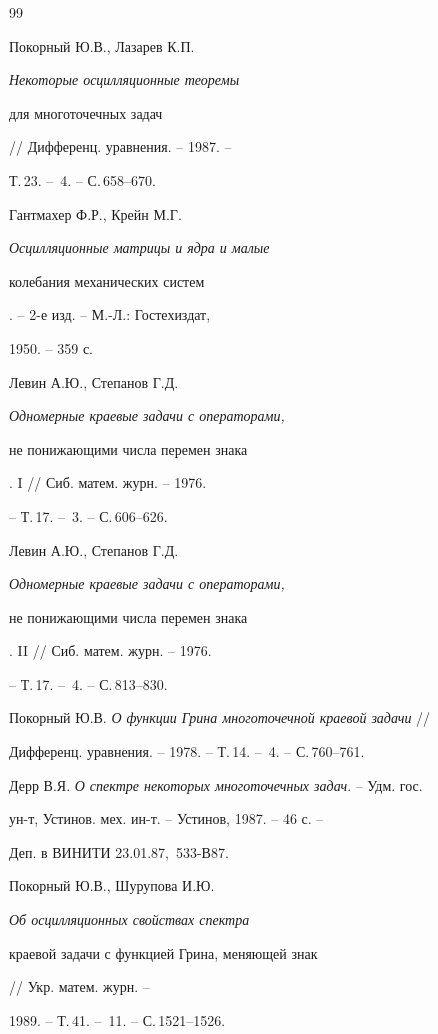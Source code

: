 \begin{thebibliography}{99} 


 




Покорный Ю.В., Лазарев К.П. {\em Некоторые осцилляционные теоремы 


для многоточечных задач} // Дифференц. уравнения. -- 1987. -- 


Т.\,23. -- \No\,4. -- С.\,658--670. 




Гантмахер Ф.Р., Крейн М.Г. {\em Осцилляционные матрицы и ядра и малые 


колебания механических систем}. -- 2-е изд. -- М.-Л.: Гостехиздат, 


1950. -- 359 с. 




Левин А.Ю., Степанов Г.Д. {\em Одномерные краевые задачи с операторами, 


не понижающими числа перемен знака}. I // Сиб. матем. журн. -- 1976. 


-- Т.\,17. -- \No\,3. -- С.\,606--626. 




Левин А.Ю., Степанов Г.Д. {\em Одномерные краевые задачи с операторами, 


не понижающими числа перемен знака}. II // Сиб. матем. журн. -- 1976. 


-- Т.\,17. -- \No\,4. -- С.\,813--830. 




Покорный Ю.В. {\em О функции Грина многоточечной краевой задачи} // 


Дифференц. уравнения. -- 1978. -- Т.\,14. -- \No\,4. -- С.\,760--761. 




Дерр В.Я. {\em О спектре некоторых многоточечных задач}. -- Удм. гос. 


ун-т, Устинов. мех. ин-т. -- Устинов, 1987. -- 46 с. -- 


Деп. в ВИНИТИ 23.01.87, \No\,533-В87. 




Покорный Ю.В., Шурупова И.Ю. {\em Об осцилляционных свойствах спектра 


краевой задачи с функцией Грина, меняющей знак} // Укр. матем. журн. -- 


1989. -- Т.\,41. -- \No\,11. -- С.\,1521--1526. 



\end{thebibliography}
